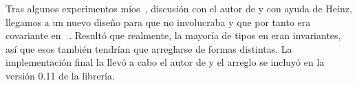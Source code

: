 Tras algunos experimentos míos~\cite{attempt_covariance}, discusión con el autor
de \abistable y con ayuda de Heinz, llegamos a un nuevo diseño para
 que no involucraba  y que por tanto era
covariante en ~\cite{abi_covandcontra}. Resultó que realmente, la
mayoría de tipos en \abistable eran invariantes, así que esos también tendrían
que arreglarse de formas distintas. La implementación final la llevó a cabo el
autor de \abistable y el arreglo se incluyó en la versión 0.11 de la librería.
